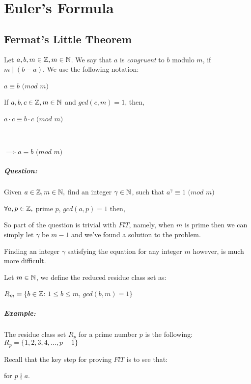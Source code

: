 \documentclass[../main.tex]{subfiles}
\begin{document}
\chapter{Euler's Formula}
\section{Fermat's Little Theorem}
\begin{defn}[Congruence]
    Let $a,b,m \in \mathbb{Z}, m \in \mathbb{N}$. We say that $a$ is \textit{congruent} to $b$ modulo $m$, if $m \mid (b-a)$. We use the following notation: \\
    \centerline{$a \equiv b$  $(mod$ $m)$}
\end{defn}
\begin{thm}
    If $a,b,c \in \mathbb{Z}, m \in \mathbb{N}$ and $gcd(c,m)=1$, then, \\
    \centerline{$a \cdot c \equiv b \cdot c$ $(mod$ $ m)$} \\
    \centerline{$\implies a \equiv b$ $(mod$ $ m)$}
\end{thm}
\paragraph{Question:}
Given $a \in \mathbb{Z}, m \in \mathbb{N},$ find an integer $\gamma \in \mathbb{N}$, such that $a^\gamma \equiv 1$ $(mod$ $m)$
\begin{thm}
    $\forall a, p \in \mathbb{Z},$ prime $p$, $gcd(a,p)=1$ then, \\
    \centerline{}
\end{thm}
So part of the question is trivial with $FlT$, namely, when $m$ is prime then we can simply let $\gamma$ be $m-1$ and we've found a solution to the problem.

Finding an integer $\gamma$ satisfying the equation for any integer $m$ however, is much more difficult.
\begin{defn}
    Let $m \in \mathbb{N}$, we define the reduced residue class set as: \\
    \centerline{$R_m = \{b \in \mathbb{Z}$: $1 \leq b \leq m$, $gcd(b,m)=1\}$}
\end{defn}
\paragraph{Example:}
\begin{center}
    The residue class set $R_p$ for a prime number $p$ is the following: \\
    $R_p = \{1,2,3,4, ... , p-1\}$
\end{center}
Recall that the key step for proving $FlT$ is to see that: \\
\centerline{ for $p \nmid a$.}
\end{document}
